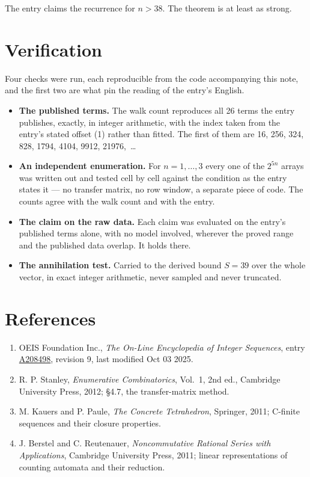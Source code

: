 \documentclass[11pt]{article}
\theoremstyle{definition}
\begin{document}
The entry claims the recurrence for $n > 38$. The theorem is at least as strong.

\section{Verification}

Four checks were run, each reproducible from the code accompanying this note, and the first two are what pin the reading of the entry's English.

\begin{itemize}

\item {\bfseries The published terms.} The walk count reproduces all 26 terms the entry publishes, exactly, in integer arithmetic, with the index taken from the entry's stated offset (1) rather than fitted. The first of them are 16, 256, 324, 828, 1794, 4104, 9912, 21976,~\dots

\item {\bfseries An independent enumeration.} For $n = 1,\dots,3$ every one of the $2^{5n}$ arrays was written out and tested cell by cell against the condition as the entry states it --- no transfer matrix, no row window, a separate piece of code. The counts agree with the walk count and with the entry.

\item {\bfseries The claim on the raw data.} Each claim was evaluated on the entry's published terms alone, with no model involved, wherever the proved range and the published data overlap. It holds there.

\item {\bfseries The annihilation test.} Carried to the derived bound $S = 39$ over the whole vector, in exact integer arithmetic, never sampled and never truncated.

\end{itemize}

\section{References}

\begin{enumerate}

\item OEIS Foundation Inc., \emph{The On-Line Encyclopedia of Integer Sequences}, entry \href{https://oeis.org/A208498}{A208498}, revision 9, last modified Oct 03 2025.

\item R. P. Stanley, \emph{Enumerative Combinatorics}, Vol.~1, 2nd ed., Cambridge University Press, 2012; \S4.7, the transfer-matrix method.

\item M. Kauers and P. Paule, \emph{The Concrete Tetrahedron}, Springer, 2011; C-finite sequences and their closure properties.

\item J. Berstel and C. Reutenauer, \emph{Noncommutative Rational Series with Applications}, Cambridge University Press, 2011; linear representations of counting automata and their reduction.

\end{enumerate}
\end{document}
